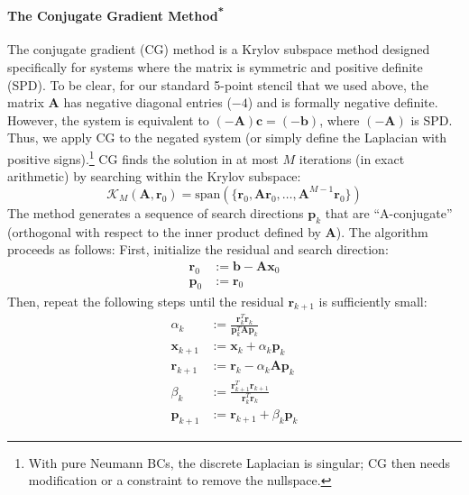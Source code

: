 \paragraph*{\texorpdfstring{The Conjugate Gradient Method\textsuperscript{*}}{The Conjugate Gradient Method}}
The conjugate gradient (CG) method is a Krylov subspace method designed specifically for systems where the matrix is symmetric and positive definite (SPD). To be clear, for our standard 5-point stencil that we used above, the matrix $\mathbf{A}$ has negative diagonal entries ($-4$) and is formally negative definite. However, the system is equivalent to $(-\mathbf{A})\mathbf{c} = (-\mathbf{b})$, where $(-\mathbf{A})$ is SPD. Thus, we apply CG to the negated system (or simply define the Laplacian with positive signs).\footnote{With pure Neumann BCs, the discrete Laplacian is singular; CG then needs modification or a constraint to remove the nullspace.} CG finds the solution in at most $M$ iterations (in exact arithmetic) by searching within the Krylov subspace:
\begin{equation}
    \mathcal{K}_M(\mathbf{A}, \mathbf{r}_0) = \text{span}(\{\mathbf{r}_0, \mathbf{A}\mathbf{r}_0, \dots, \mathbf{A}^{M-1}\mathbf{r}_0\})
\end{equation}
The method generates a sequence of search directions $\mathbf{p}_k$ that are ``A-conjugate'' (orthogonal with respect to the inner product defined by $\mathbf{A}$). The algorithm proceeds as follows: First, initialize the residual and search direction:
\begin{equation}
    \begin{aligned}
        \mathbf{r}_0 &:= \mathbf{b} - \mathbf{A}\mathbf{x}_0 \\
        \mathbf{p}_0 &:= \mathbf{r}_0
    \end{aligned}
\end{equation}
Then, repeat the following steps until the residual $\mathbf{r}_{k+1}$ is sufficiently small:
\begin{equation}
    \begin{aligned}
        \alpha_k &:= \frac{\mathbf{r}_k^T \mathbf{r}_k}{\mathbf{p}_k^T \mathbf{A} \mathbf{p}_k} \\
        \mathbf{x}_{k+1} &:= \mathbf{x}_k + \alpha_k \mathbf{p}_k \\
        \mathbf{r}_{k+1} &:= \mathbf{r}_k - \alpha_k \mathbf{A} \mathbf{p}_k \\
        \beta_k &:= \frac{\mathbf{r}_{k+1}^T \mathbf{r}_{k+1}}{\mathbf{r}_k^T \mathbf{r}_k} \\
        \mathbf{p}_{k+1} &:= \mathbf{r}_{k+1} + \beta_k \mathbf{p}_k
    \end{aligned}
\end{equation}
